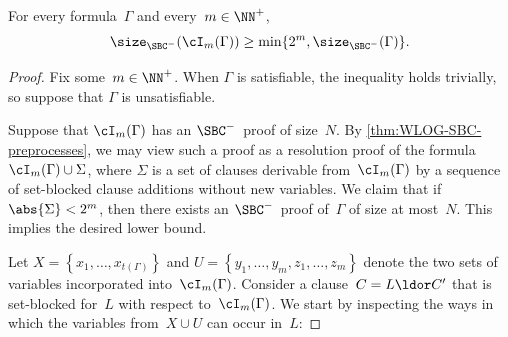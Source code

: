 \documentclass[10pt,a4paper]{article}
\begin{document}
\begin{lemma}\label{thm:guarding-blocked-pair-hard-for-SBC}
  For every formula~$\Gamma$ and every~$m \in \NN^+$,
  \begin{equation*}
    \size_{\SBC^-}(\cI_m(\Gamma)) \geq \min\{2^m, \size_{\SBC^-}(\Gamma)\}.
  \end{equation*}
\end{lemma}
\begin{proof}
  Fix some~$m \in \NN^+$.
  When $\Gamma$ is satisfiable, the inequality holds trivially,
  so suppose that $\Gamma$ is unsatisfiable.

  Suppose that $\cI_m(\Gamma)$ has an $\SBC^-$~proof of size~$N$.
  By \cref{thm:WLOG-SBC-preprocesses}, we may view such a proof
  as a resolution proof of the formula~$\cI_m(\Gamma) \cup \Sigma$,
  where $\Sigma$ is a set of clauses derivable from~$\cI_m(\Gamma)$
  by a sequence of set-blocked clause additions without new variables.
  We claim that if $\abs{\Sigma} < 2^m$,
  then there exists an $\SBC^-$~proof of~$\Gamma$ of size at most~$N$.
  This implies the desired lower bound.

  Let $X = \left\{x_1, \dots, x_{t(\Gamma)}\right\}$
  and $U = \left\{y_1, \dots, y_m, z_1, \dots, z_m\right\}$
  denote the two sets of variables incorporated into~$\cI_m(\Gamma)$.
  Consider a clause~$C = L \ldor C'$ that is set-blocked
  for~$L$ with respect to~$\cI_m(\Gamma)$.
  We start by inspecting the ways in which
  the variables from~$X \cup U$ can occur in~$L$:


\end{proof}
\end{document}
